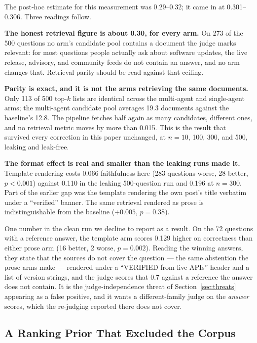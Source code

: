 \documentclass[acmsmall,review,anonymous,screen]{acmart}
\begin{document}
The post-hoc estimate for this measurement was 0.29--0.32; it came in at
0.301--0.306. Three readings follow.

\textbf{The honest retrieval figure is about 0.30, for every arm.} On 273 of
the 500 questions no arm's candidate pool contains a document the judge marks
relevant: for most questions people actually ask about software updates, the
live release, advisory, and community feeds do not contain an answer, and no
arm changes that. Retrieval parity should be read against that ceiling.

\textbf{Parity is exact, and it is not the arms retrieving the same
documents.} Only 113 of 500 top-$k$ lists are identical across the multi-agent
and single-agent arms; the multi-agent candidate pool averages 19.3 documents
against the baseline's 12.8. The pipeline fetches half again as many
candidates, different ones, and no retrieval metric moves by more than 0.015.
This is the result that survived every correction in this paper unchanged, at
$n=10$, 100, 300, and 500, leaking and leak-free.

\textbf{The format effect is real and smaller than the leaking runs made it.}
Template rendering costs 0.066 faithfulness here (283 questions worse, 28
better, $p<0.001$) against 0.110 in the leaking 500-question run and 0.196 at
$n=300$. Part of the earlier gap was the template rendering the own post's
title verbatim under a ``verified'' banner. The same retrieval rendered as prose
is indistinguishable from the baseline ($+0.005$, $p=0.38$).

One number in the clean run we decline to report as a result. On the 72
questions with a reference answer, the template arm scores 0.129 higher on
correctness than either prose arm (16 better, 2 worse, $p=0.002$). Reading the
winning answers, they state that the sources do not cover the question --- the
same abstention the prose arms make --- rendered under a ``VERIFIED from live
APIs'' header and a list of version strings, and the judge scores that 0.7
against a reference the answer does not contain. It is the judge-independence
threat of Section~\ref{sec:threats} appearing as a false positive, and it wants
a different-family judge on the \emph{answer} scores, which the re-judging
reported there does not cover.

\subsection{A Ranking Prior That Excluded the Corpus}\label{sec:tier}
\end{document}
